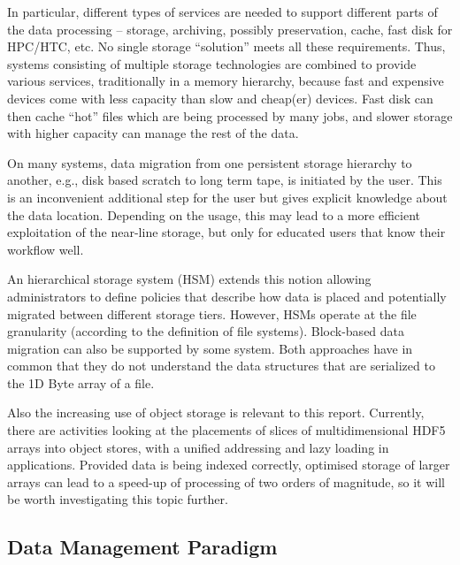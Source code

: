 \documentclass{../../template/esiwace-report}
\begin{document}
In particular, different types of services are needed to support different parts of the data processing -- storage, archiving, possibly preservation, cache, fast disk for HPC/HTC, etc.  No single storage ``solution'' meets all these requirements.  Thus, systems consisting of multiple storage technologies are combined to provide various services, traditionally in a memory hierarchy, because fast and expensive devices come
with less capacity than slow and cheap(er) devices.  Fast disk can then cache ``hot'' files which are being processed by many jobs, and slower storage with higher capacity can manage the rest of the data.

On many systems, data migration from one persistent storage hierarchy to another, e.g., disk based scratch to long term tape, is initiated by the user.
This is an inconvenient additional step for the user but gives explicit knowledge about the data location. Depending on the usage, this may lead to a more efficient 
exploitation of the near-line storage, but only for educated users that know their workflow well.

An hierarchical storage system (HSM) extends this notion allowing administrators to define policies that describe how data is placed and potentially migrated between 
different storage tiers. However, HSMs operate at the file granularity (according to the definition of file systems). Block-based data migration can also be supported
by some system. Both approaches have in common that they do not understand the data structures that are serialized to the 1D Byte array of a file.

Also the increasing use of object storage is relevant to this report.  Currently, there are activities looking at the placements of slices of multidimensional HDF5 arrays into object stores, with a unified addressing and lazy loading in applications.  Provided data is being indexed correctly, optimised storage of larger arrays can lead to a speed-up of processing of two orders of magnitude, so it will be worth investigating this topic further.

\subsection{Data Management Paradigm}
\end{document}
